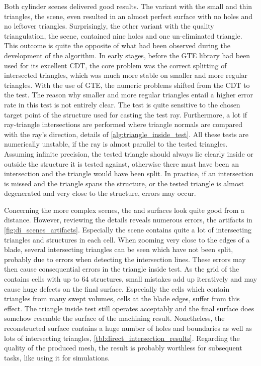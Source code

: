 Both cylinder scenes delivered good results.
The variant with the small and thin triangles, \ie the \cylinders scene, even resulted in an almost perfect surface with no holes and no leftover triangles.
Surprisingly, the other variant with the quality triangulation, \ie the \cylindersd scene, contained nine holes and one un-eliminated triangle.
This outcome is quite the opposite of what had been observed during the development of the algorithm.
In early stages, before the GTE library had been used for its excellent CDT, the core problem was the correct splitting of intersected triangles, which was much more stable on smaller and more regular triangles.
With the use of GTE, the numeric problems shifted from the CDT to the  test.
The reason why smaller and more regular triangles entail a higher error rate in this test is not entirely clear.
The test is quite sensitive to the chosen target point of the structure used for casting the test ray.
Furthermore, a lot if ray-triangle intersections are performed where triangle normals are compared with the ray's direction, \cf details of \cref{alg:triangle_inside_test}.
All these tests are numerically unstable, if the ray is almost parallel to the tested triangles.
Assuming infinite precision, the tested triangle should always lie clearly inside or outside the structure it is tested against, otherwise there must have been an intersection and the triangle would have been split.
In practice, if an intersection is missed and the triangle spans the structure, or the tested triangle is almost degenerated and very close to the structure, errors may occur.

Concerning the more complex scenes, the \impeller and \turbine surfaces look quite good from a distance.
However, reviewing the details reveals numerous errors, \cf the artifacts in \cref{fig:di_scenes_artifacts}.
Especially the \impeller scene contains quite a lot of intersecting triangles and structures in each cell.
When zooming very close to the edges of a blade, several intersecting triangles can be seen which have not been split, probably due to errors when detecting the intersection lines.
These errors may then cause consequential errors in \eg the triangle inside test.
As the grid of the \impeller contains cells with up to 64 structures, small mistakes add up iteratively and may cause huge defects on the final surface.
Especially the cells which contain triangles from many swept volumes, \ie cells at the blade edges, suffer from this effect.
The triangle inside test still operates acceptably and the final surface does somehow resemble the surface of the machining result.
Nonetheless, the reconstructed surface contains a huge number of holes and boundaries as well as lots of intersecting triangles, \cf \cref{tbl:direct_intersection_results}.
Regarding the quality of the produced mesh, the result is probably worthless for subsequent tasks, like using it for simulations.

